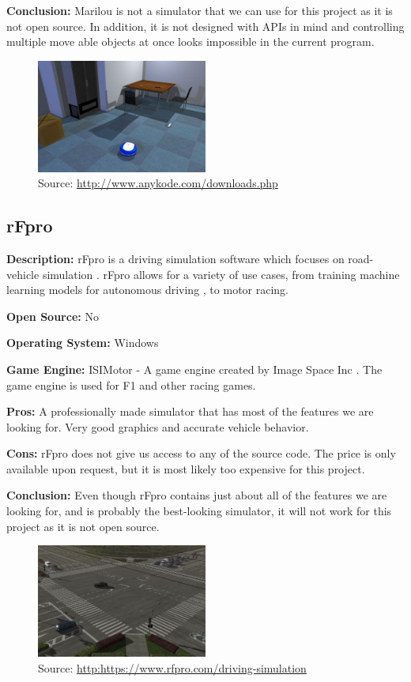 \textbf{Conclusion:} Marilou is not a simulator that we can use for this project as it is not open source. In addition, it is not designed with APIs in mind and controlling multiple move able objects at once looks impossible in the current program. 

\begin{figure}[H]
    \centering
    \includegraphics[width=0.5\textwidth]{Simulators/Marilou.jpg}
    \caption{Source: \url{http://www.anykode.com/downloads.php}}
\end{figure}


\subsection{rFpro}
\textbf{Description:} rFpro is a driving simulation software which focuses on road-vehicle simulation \cite{rFpro_Web}. rFpro allows for a variety of use cases, from training machine learning models for autonomous driving \cite{rFpro_ML}, to motor racing.

\textbf{Open Source:} No

\textbf{Operating System:} Windows

\textbf{Game Engine:} ISIMotor - A game engine created by Image Space Inc \cite{ISIMotor}. The game engine is used for F1 and other racing games.

\textbf{Pros:} A professionally made simulator that has most of the features we are looking for. Very good graphics and accurate vehicle behavior. 

\textbf{Cons:} rFpro does not give us access to any of the source code. The price is only available upon request, but it is most likely too expensive for this project. 

\textbf{Conclusion:} Even though rFpro contains just about all of the features we are looking for, and is probably the best-looking simulator, it will not work for this project as it is not open source. 

\begin{figure}[H]
    \centering
    \includegraphics[width=0.5\textwidth]{Simulators/rFpro.jpg}
    \caption{Source: \url{http:https://www.rfpro.com/driving-simulation}}
\end{figure}

